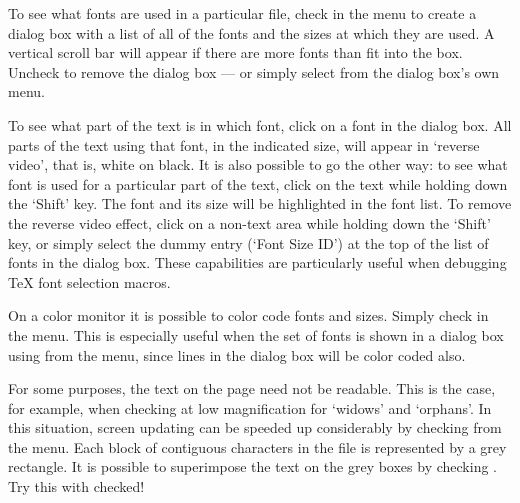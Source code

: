 
To see what fonts are used in a particular {\DVI} file, check
 in the  %
menu to create a dialog box
with a list of all of the fonts and the sizes at which they are used.
A vertical scroll bar will appear if there are more fonts than fit into
the box. 
Uncheck  to remove the dialog box --- or simply select
 from the dialog box's own  menu.

To see what part of the text is in which font, click on a font in the
dialog box.  
All parts of the text using that font, in the indicated size,
will appear in `reverse video', that is, white on black.
It is also possible to go the other way:
to see what font is used for a particular part of the text,
click on the text while holding down the `Shift' key.
The font and its size will be highlighted in the font list. %
%
To remove the reverse video effect, click on a non-text area while
holding down the `Shift' key, 
or simply select the dummy entry (`Font Size ID') %
at the top of the list of fonts in the dialog box. %
These capabilities are particularly useful when debugging 
{\TeX} font selection macros. 



On a color monitor it is possible to color code fonts and sizes.
Simply check  in the  menu.
This is especially useful when the set of fonts is shown in a
dialog box using  from the  %
menu, %
since lines in the dialog box will be color coded also.



For some purposes, the text on the page need not %
be readable.
This is the case, for example, when checking at low magnification for
`widows' and `orphans'.
In this situation, screen updating can be speeded up considerably by
checking  from the  menu.
Each block of contiguous characters in the {\DVI} file is 
represented by a grey rectangle.
It is %
possible to superimpose the text on the grey boxes by
checking .
Try this with  checked!

